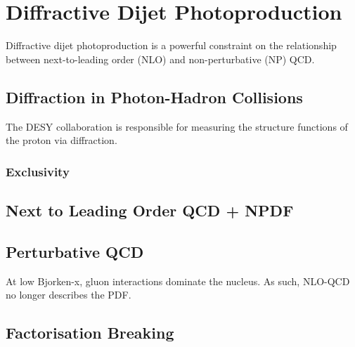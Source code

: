 
\chapter{Diffractive Dijet Photoproduction}

Diffractive dijet photoproduction is a powerful constraint on the relationship between next-to-leading order (NLO) and non-perturbative (NP) QCD.

\section{Diffraction in Photon-Hadron Collisions}

The DESY collaboration is responsible for measuring the structure functions of the proton via diffraction.

\subsection{Exclusivity}

\section{Next to Leading Order QCD + NPDF}



\section{Perturbative QCD}

At low Bjorken-x, gluon interactions dominate the nucleus. As such, NLO-QCD no longer describes the PDF.

\section{Factorisation Breaking}

